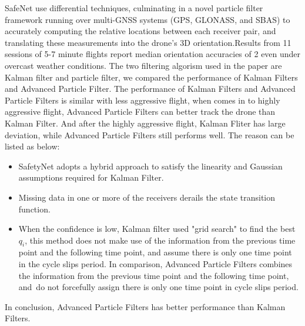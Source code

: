 \documentclass[journal,onecolumn]{IEEEtran}
\begin{document}
SafeNet use differential techniques, culminating in a novel particle filter framework running over multi-GNSS systems (GPS, GLONASS, and SBAS) to accurately computing the relative locations between each receiver pair, and translating these measurements into the drone’s 3D orientation.Results from 11 sessions of 5-7 minute flights report median orientation accuracies of 2  even under overcast weather conditions. The two filtering algorism used in the paper are Kalman filter and particle filter, we compared the performance of Kalman Filters and Advanced Particle Filter. The performance of Kalman Filters
and Advanced Particle Filters is similar with less aggressive flight, when comes in to highly aggressive flight,
Advanced Particle Filters can better track the drone than Kalman Filter. And after the highly aggressive flight,
Kalman Fliter has large deviation, while Advanced Particle Filters still performs well.
The reason can be listed as below:
\begin{itemize}
\item SafetyNet adopts a hybrid approach to satisfy the linearity and Gaussian assumptions required for Kalman Filter.
\item Missing data in one or more of the receivers derails the state transition function.
\item When the confidence is low, Kalman filter used "grid search" to find the best $q_i$,
this method does not make use of the information from the previous time point and the following time point,
and assume there is only one time point in the cycle slips period.
In comparison, Advanced Particle Filters combines the information from the
previous time point and the following time point, and do not forcefully assign
there is only one time point in cycle slips period.
\end{itemize}

In conclusion, Advanced Particle Filters has better performance than Kalman Filters.




\end{document}
